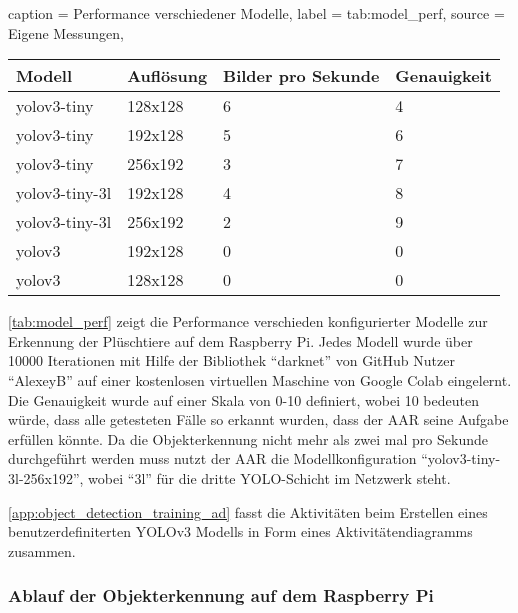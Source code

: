 \begin{dhbwtable}{%
    caption	= Performance verschiedener Modelle,
    label	= tab:model_perf,
    source	= Eigene Messungen,
}
    \begin{tabular}{llll}
        \toprule
        \textbf{Modell}     & \textbf{Auflösung}    & \textbf{Bilder pro Sekunde}   & \textbf{Genauigkeit}\\\midrule
        yolov3-tiny         & 128x128               & 6                             & 4\\
        yolov3-tiny         & 192x128               & 5                             & 6\\
        yolov3-tiny         & 256x192               & 3                             & 7\\
        yolov3-tiny-3l      & 192x128               & 4                             & 8\\
        yolov3-tiny-3l      & 256x192               & 2                             & 9\\
        yolov3              & 192x128               & 0                             & 0\\
        yolov3              & 128x128               & 0                             & 0\\\bottomrule
    \end{tabular}    
\end{dhbwtable}

\autoref{tab:model_perf} zeigt die Performance verschieden konfigurierter Modelle zur Erkennung der Plüschtiere auf dem Raspberry Pi.
Jedes Modell wurde über 10000 Iterationen mit Hilfe der Bibliothek \enquote{darknet} von GitHub Nutzer \enquote{AlexeyB} auf einer kostenlosen virtuellen Maschine von Google Colab eingelernt.
Die Genauigkeit wurde auf einer Skala von 0-10 definiert, wobei 10 bedeuten würde, dass alle getesteten Fälle so erkannt wurden, dass der \ac{AAR} seine Aufgabe erfüllen könnte.
Da die Objekterkennung nicht mehr als zwei mal pro Sekunde durchgeführt werden muss nutzt der \ac{AAR} die Modellkonfiguration \enquote{yolov3-tiny-3l-256x192}, wobei \enquote{3l} für die dritte \ac{YOLO}-Schicht im Netzwerk steht.

\autoref{app:object_detection_training_ad} fasst die Aktivitäten beim 
Erstellen eines benutzerdefiniterten \ac{YOLO}v3 Modells in Form eines Aktivitätendiagramms zusammen.

\subsubsection{Ablauf der Objekterkennung auf dem Raspberry Pi}

